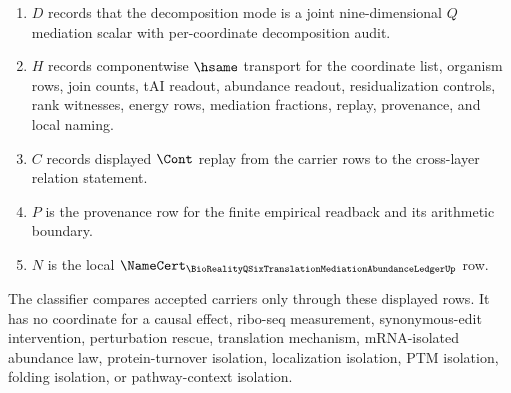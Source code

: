 \begin{definition}
\begin{enumerate}
$$\begin{aligned}
M^{QTP} &= \frac{R^2_{QP}-R^2_{QP\mid T}}{R^2_{QP}},
\end{aligned}
$$
where $R^2_{QP}$ is the residualized total association from the nine-dimensional $Q$ block to $Y$, and $R^2_{QP\mid T}$ is the direct residualized association after conditioning on $T$.
\item $D$ records that the decomposition mode is a joint nine-dimensional $Q$ mediation scalar with per-coordinate decomposition audit.
\item $H$ records componentwise $\hsame$ transport for the coordinate list, organism rows, join counts, tAI readout, abundance readout, residualization controls, rank witnesses, energy rows, mediation fractions, replay, provenance, and local naming.
\item $C$ records displayed $\Cont$ replay from the carrier rows to the cross-layer relation statement.
\item $P$ is the provenance row for the finite empirical readback and its arithmetic boundary.
\item $N$ is the local $\NameCert_{\BioRealityQSixTranslationMediationAbundanceLedgerUp}$ row.
\end{enumerate}
The classifier compares accepted carriers only through these displayed rows. It has no coordinate for a causal effect, ribo-seq measurement, synonymous-edit intervention, perturbation rescue, translation mechanism, mRNA-isolated abundance law, protein-turnover isolation, localization isolation, PTM isolation, folding isolation, or pathway-context isolation.
\end{definition}

